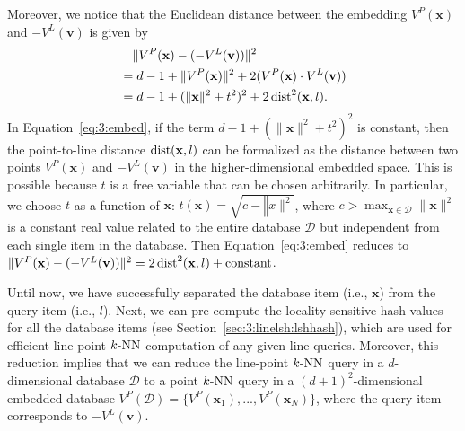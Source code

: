 Moreover, we notice that the Euclidean distance between the embedding $V^P(\mathbf x)$ and $-V^L(\mathbf v)$ is given by
\begin{equation}
  \begin{aligned}
    \label{eq:3:embed}
    &\quad{} \|V^P(\mathbf x) - (- V^L(\mathbf v)) \|^2 \\
    &= d - 1 + \|V^P(\mathbf x)\|^2 + 2(V^P(\mathbf x) \cdot V^L(\mathbf v)) \\
    &= d - 1 + (\|\mathbf x\|^2 + t^2)^2 + 2\operatorname{dist}^2(\mathbf x, l).
  \end{aligned}
\end{equation}
In Equation~\ref{eq:3:embed}, if the term $d - 1 + (\|\mathbf x\|^2 + t^2)^2$ is constant, then the point-to-line distance $\operatorname{dist}(\mathbf x, l)$ can be formalized as the distance between two points $V^P(\mathbf x)$ and $-V^L(\mathbf v)$ in the higher-dimensional embedded space. This is possible because $t$ is a free variable that can be chosen arbitrarily. In particular, we choose $t$ as a function of $\mathbf x$: $t(\mathbf x) = \sqrt{c - \mathbf \|x\|^2}$, where $c > \max_{\mathbf x \in \mathcal D}\|\mathbf x\|^2$ is a constant real value related to the entire database $\mathcal D$ but independent from each single item in the database. Then Equation~\ref{eq:3:embed} reduces to $\|V^P(\mathbf x) - (- V^L(\mathbf v)) \|^2 = 2 \operatorname{dist}^2(\mathbf x, l) + \text{constant}$.

Until now, we have successfully separated the database item (i.e., $\mathbf x$) from the query item (i.e., $l$). Next, we can pre-compute the locality-sensitive hash values for all the database items (see Section~\ref{sec:3:linelsh:lshhash}), which are used for efficient line-point $k\text{-NN}$ computation of any given line queries. Moreover, this reduction implies that we can reduce the line-point $k\text{-NN}$ query in a $d$-dimensional database $\mathcal D$ to a point $k\text{-NN}$ query in a $(d+1)^2$-dimensional embedded database $V^P(\mathcal D) = \{V^P(\mathbf x_1), ..., V^P(\mathbf x_N) \}$, where the query item corresponds to $-V^L(\mathbf v)$.

